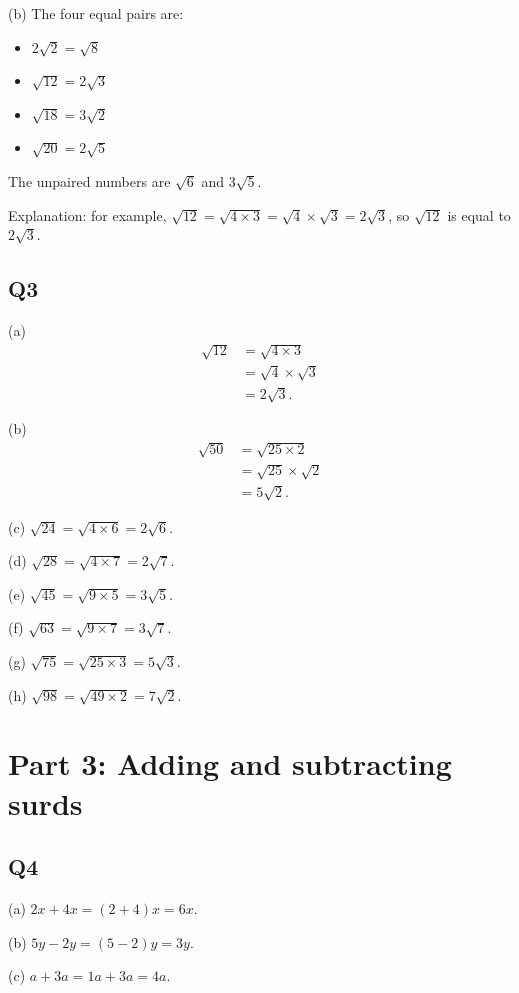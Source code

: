 \documentclass[12pt,a4paper]{article}
\begin{document}
(b) The four equal pairs are:
\begin{itemize}
\item $2\sqrt2 = \sqrt8$
\item $\sqrt{12} = 2\sqrt3$
\item $\sqrt{18} = 3\sqrt2$
\item $\sqrt{20} = 2\sqrt5$
\end{itemize}
The unpaired numbers are $\sqrt6$ and $3\sqrt5$.

Explanation: for example, $\sqrt{12} = \sqrt{4\times3} = \sqrt4 \times \sqrt3 = 2\sqrt3$, so $\sqrt{12}$ is equal to $2\sqrt3$.

\subsection*{Q3}
(a)
\begin{align*}
\sqrt{12} &= \sqrt{4\times3} \\
&= \sqrt4 \times \sqrt3 \\
&= 2\sqrt3.
\end{align*}

(b)
\begin{align*}
\sqrt{50} &= \sqrt{25\times2} \\
&= \sqrt{25} \times \sqrt2 \\
&= 5\sqrt2.
\end{align*}

(c) $\sqrt{24} = \sqrt{4\times6} = 2\sqrt6$.

(d) $\sqrt{28} = \sqrt{4\times7} = 2\sqrt7$.

(e) $\sqrt{45} = \sqrt{9\times5} = 3\sqrt5$.

(f) $\sqrt{63} = \sqrt{9\times7} = 3\sqrt7$.

(g) $\sqrt{75} = \sqrt{25\times3} = 5\sqrt3$.

(h) $\sqrt{98} = \sqrt{49\times2} = 7\sqrt2$.

\section*{Part 3: Adding and subtracting surds}

\subsection*{Q4}
(a) $2x+4x = (2+4)x = 6x$.

(b) $5y-2y = (5-2)y = 3y$.

(c) $a+3a = 1a+3a = 4a$.
\end{document}
